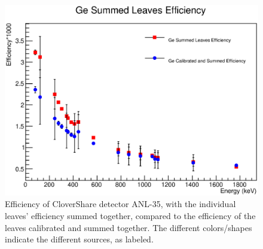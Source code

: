 \begin{figure}
    \centering
    \includegraphics[scale=0.7]{Setup_Figs/Efficiency_ind_vs_sum.eps}
    \caption{Efficiency of CloverShare detector ANL-35, with the individual leaves' efficiency summed together, compared to the efficiency of the leaves calibrated and summed together. The different colors/shapes indicate the different sources, as labeled.}
    \label{fig:Clover_ind_vs_sum}
\end{figure}